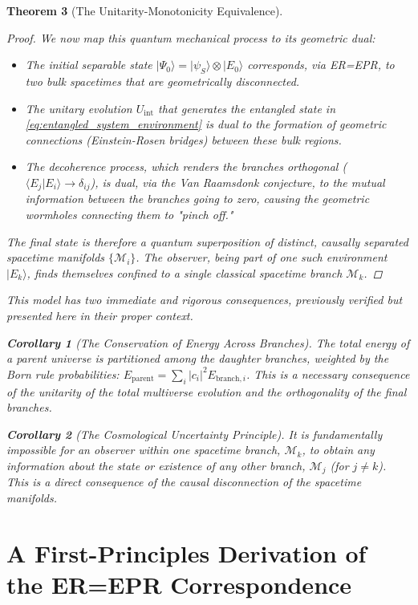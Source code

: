 \documentclass[11pt, letterpaper]{report}
\theoremstyle{plain} %
\newtheorem{theorem}{Theorem}[chapter]
\newtheorem{corollary}[theorem]{Corollary}
\theoremstyle{definition} %
\theoremstyle{remark} %
\begin{document}
\begin{theorem}[The Unitarity-Monotonicity Equivalence]
\begin{proof}
We now map this quantum mechanical process to its geometric dual:
\begin{itemize}
    \item The initial separable state $|\Psi_0\rangle = |\psi_S\rangle \otimes |E_0\rangle$ corresponds, via ER=EPR, to two bulk spacetimes that are geometrically disconnected.
    \item The unitary evolution $U_{\text{int}}$ that generates the entangled state in \cref{eq:entangled_system_environment} is dual to the formation of geometric connections (Einstein-Rosen bridges) between these bulk regions.
    \item The decoherence process, which renders the branches orthogonal ($\langle E_j|E_i\rangle \to \delta_{ij}$), is dual, via the Van Raamsdonk conjecture, to the mutual information between the branches going to zero, causing the geometric wormholes connecting them to "pinch off."
\end{itemize}
The final state is therefore a quantum superposition of distinct, causally separated spacetime manifolds $\{\mathcal{M}_i\}$. The observer, being part of one such environment $|E_k\rangle$, finds themselves confined to a single classical spacetime branch $\mathcal{M}_k$.
\end{proof}

This model has two immediate and rigorous consequences, previously verified but presented here in their proper context.

\begin{corollary}[The Conservation of Energy Across Branches]
The total energy of a parent universe is partitioned among the daughter branches, weighted by the Born rule probabilities: $E_{\text{parent}} = \sum_i |c_i|^2 E_{\text{branch}, i}$. This is a necessary consequence of the unitarity of the total multiverse evolution and the orthogonality of the final branches.
\end{corollary}

\begin{corollary}[The Cosmological Uncertainty Principle]
It is fundamentally impossible for an observer within one spacetime branch, $\mathcal{M}_k$, to obtain any information about the state or existence of any other branch, $\mathcal{M}_j$ (for $j \neq k$). This is a direct consequence of the causal disconnection of the spacetime manifolds.
\end{corollary}



\section{A First-Principles Derivation of the ER=EPR Correspondence}
\label{sec:er_epr_derivation}


\end{theorem}
\end{document}
